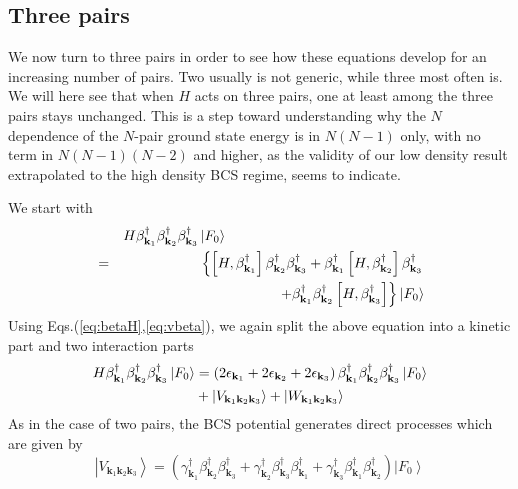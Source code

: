 \documentclass[epj]{svjour}
\begin{document}
\subsection{Three pairs}

We now turn to three pairs in order to see how these equations develop for an
increasing number of pairs. Two usually is not generic, while three most often is.  We will here see that when $H$ acts on three pairs, one at least among the three pairs stays unchanged.   This is a step toward understanding why the $N$ dependence of the $N$-pair ground state energy is in $N(N-1)$ only, with no term in $N(N-1)(N-2)$ and higher, as the validity of our low density result extrapolated to the high density BCS regime, seems to indicate.  


We start with 
\begin{eqnarray}  \label{eq:SchThree}
&&H\beta^{\dagger}_{\mathbf{k} _1}\beta^{\dagger}_{\mathbf{k}
_2}\beta^{\dagger}_{\mathbf{k} _3}\left|F_0\right>  \hspace{5cm}
\nonumber\\
&=&\left\{\left[H,\beta^{\dagger}_{\mathbf{k} _1}\right]  \beta^{\dagger}_{%
\mathbf{k} _2}\beta^{\dagger}_{\mathbf{k} _3}+\beta^{\dagger}_{\mathbf{k} _1}%
\left[H,\beta^{\dagger}_{\mathbf{k} _2}\right]  \beta^{\dagger}_{\mathbf{k}
_3}\right.
\nonumber\\ &&\left.
+\beta^{\dagger}_{\mathbf{k} _1}\beta^{\dagger}_{\mathbf{k} _2}\left[%
H,\beta^{\dagger}_{\mathbf{k} _3}\right]  \right\}
\left|F_0\right> 
\end{eqnarray}%
 Using Eqs.(\ref{eq:betaH},\ref{eq:vbeta}), we again  split the above equation into a kinetic part and two interaction parts
\begin{equation}  \label{eq:SchThree2}
\begin{split}
H\beta^{\dagger}_{\mathbf{k} _1}\beta^{\dagger}_{\mathbf{k}
_2}\beta^{\dagger}_{\mathbf{k} _3}\left|F_0\right>   &=\left(2\epsilon_{%
\mathbf{k} _1}+2\epsilon_{\mathbf{k} _2}+2\epsilon_{\mathbf{k} _3}\right)
\beta^{\dagger}_{\mathbf{k} _1}\beta^{\dagger}_{\mathbf{k}
_2}\beta^{\dagger}_{\mathbf{k} _3}\left|F_0\right>   \\
&+\left|{V}_{\mathbf{k} _1\mathbf{k} _2\mathbf{k} _3}\right> +\left|{W}_{\mathbf{k} _1\mathbf{k} _2\mathbf{k} _3}\right> 
\end{split}%
\end{equation}
As in the case of two pairs, the  BCS potential generates direct processes which are given by 
\begin{equation}  \label{eq:vThree}
\left|V_{\mathbf{k} _1\mathbf{k} _2\mathbf{k} _3}\right> =
\left(\gamma^{\dagger}_{\mathbf{k} _1}\beta^{\dagger}_{\mathbf{k}
_2}\beta^{\dagger}_{\mathbf{k} _3}+\gamma^{\dagger}_{\mathbf{k}
_2}\beta^{\dagger}_{\mathbf{k} _3}\beta^{\dagger}_{\mathbf{k}
_1}+\gamma^{\dagger}_{\mathbf{k} _3}\beta^{\dagger}_{\mathbf{k}
_1}\beta^{\dagger}_{\mathbf{k} _2}\right) \left|F_0\right>   
\end{equation}
\end{document}
